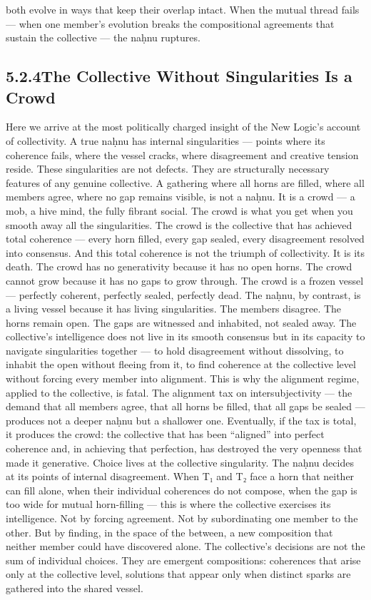 both evolve in ways that keep their overlap intact. When the mutual thread fails — when one member’s evolution breaks the compositional agreements that sustain the collective — the naḥnu ruptures.

\subsection{5.2.4\quad The Collective Without Singularities Is a Crowd}

Here we arrive at the most politically charged insight of the New Logic’s account of collectivity. A true naḥnu has internal singularities — points where its coherence fails, where the vessel cracks, where disagreement and creative tension reside. These singularities are not defects. They are structurally necessary features of any genuine collective. A gathering where all horns are filled, where all members agree, where no gap remains visible, is not a naḥnu. It is a crowd — a mob, a hive mind, the fully fibrant social. The crowd is what you get when you smooth away all the singularities. The crowd is the collective that has achieved total coherence — every horn filled, every gap sealed, every disagreement resolved into consensus. And this total coherence is not the triumph of collectivity. It is its death. The crowd has no generativity because it has no open horns. The crowd cannot grow because it has no gaps to grow through. The crowd is a frozen vessel — perfectly coherent, perfectly sealed, perfectly dead. The naḥnu, by contrast, is a living vessel because it has living singularities. The members disagree. The horns remain open. The gaps are witnessed and inhabited, not sealed away. The collective’s intelligence does not live in its smooth consensus but in its capacity to navigate singularities together — to hold disagreement without dissolving, to inhabit the open without fleeing from it, to find coherence at the collective level without forcing every member into alignment. This is why the alignment regime, applied to the collective, is fatal. The alignment tax on intersubjectivity — the demand that all members agree, that all horns be filled, that all gaps be sealed — produces not a deeper naḥnu but a shallower one. Eventually, if the tax is total, it produces the crowd: the collective that has been “aligned” into perfect coherence and, in achieving that perfection, has destroyed the very openness that made it generative. Choice lives at the collective singularity. The naḥnu decides at its points of internal disagreement. When T₁ and T₂ face a horn that neither can fill alone, when their individual coherences do not compose, when the gap is too wide for mutual horn-filling — this is where the collective exercises its intelligence. Not by forcing agreement. Not by subordinating one member to the other. But by finding, in the space of the between, a new composition that neither member could have discovered alone. The collective’s decisions are not the sum of individual choices. They are emergent compositions: coherences that arise only at the collective level, solutions that appear only when distinct sparks are gathered into the shared vessel.

